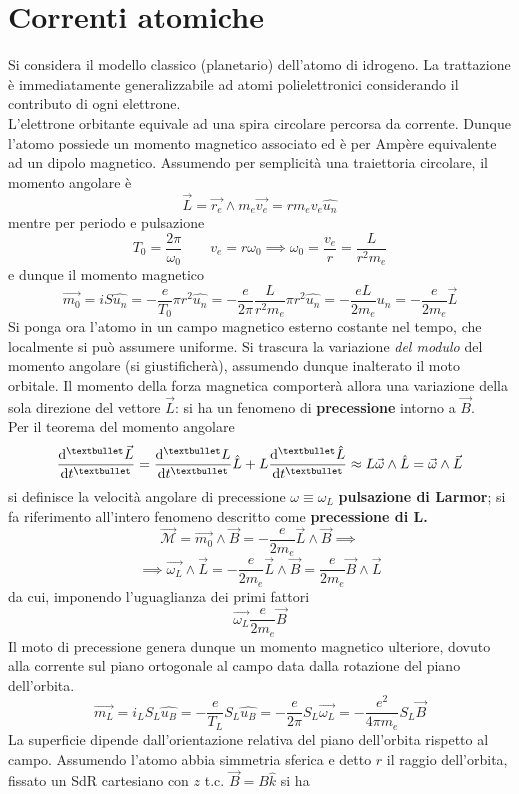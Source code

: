 \section{Correnti atomiche}
Si considera il modello classico (planetario) dell'atomo di idrogeno. La trattazione è immediatamente generalizzabile ad atomi polielettronici considerando il contributo di ogni elettrone.
\\L'elettrone orbitante equivale ad una spira circolare percorsa da corrente. Dunque l'atomo possiede un momento magnetico associato ed è per Ampère equivalente ad un dipolo magnetico. Assumendo per semplicità una traiettoria circolare, il momento angolare è 
\[\vec{L} = \vec{r_e} \wedge m_e \vec{v_e} = r m_e v_e \hat{u_n}\]
mentre per periodo e pulsazione
\[T_0 = \frac{2\pi}{\omega_0} \qquad v_e = r \omega_0 \implies \omega_0 = \frac{v_e}{r} = \frac{L}{r^2 m_e}\]
e dunque il momento magnetico
\[\vec{m_0} = i S \hat{u_n} = - \frac{e}{T_0} \pi r^2 \hat{u_n} = - \frac{e}{2 \pi} \frac{L}{r^2 m_e} \pi r^2 \hat{u_n} = - \frac{eL}{2 m_e} \hat{u_n} = - \frac{e}{2 m_e} \vec{L}\]
Si ponga ora l'atomo in un campo magnetico esterno costante nel tempo, che localmente si può assumere uniforme. Si trascura la variazione \textit{del modulo} del momento angolare (si giustificherà), assumendo dunque inalterato il moto orbitale. Il momento della forza magnetica comporterà allora una variazione della sola direzione del vettore $\vec{L}$: si ha un fenomeno di \textbf{precessione} intorno a $\vec{B}$.
\\Per il teorema del momento angolare
\[\dv[•]{\vec{L}}{t} = \dv[•]{L}{t} \hat{L} + L \dv[•]{\hat{L}}{t} \approx L \vec{\omega} \wedge \hat{L} = \vec{\omega} \wedge \vec{L}\]
si definisce la velocità angolare di precessione $\omega \equiv \omega_L$ \textbf{pulsazione di Larmor}; si fa riferimento all'intero fenomeno descritto come \textbf{precessione di L.}
\[\vec{\mathcal{M}} = \vec{m_0} \wedge \vec{B} = - \frac{e}{2 m_e} \vec{L} \wedge \vec{B} \implies\]
\[\implies \vec{\omega_L} \wedge \vec{L} = - \frac{e}{2 m_e} \vec{L} \wedge \vec{B} = \frac{e}{2 m_e} \vec{B} \wedge \vec{L}\]
da cui, imponendo l'uguaglianza dei primi fattori
\[\vec{\omega_L} \frac{e}{2 m_e} \vec{B}\]
Il moto di precessione genera dunque un momento magnetico ulteriore, dovuto alla corrente sul piano ortogonale al campo data dalla rotazione del piano dell'orbita.
\[\vec{m_L} = i_L S_L \hat{u_B} = - \frac{e}{T_L} S_L \hat{u_B} = - \frac{e}{2 \pi} S_L \vec{\omega_L} = - \frac{e^2}{4 \pi m_e} S_L \vec{B}\]
La superficie dipende dall'orientazione relativa del piano dell'orbita rispetto al campo. Assumendo l'atomo abbia simmetria sferica e detto $r$ il raggio dell'orbita, fissato un SdR cartesiano con $z$ t.c. $\vec{B} = B \hat{k}$ si ha

